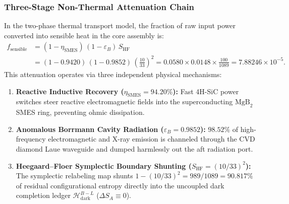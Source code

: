 \documentclass[11pt,onecolumn]{article}
\begin{document}
\subsubsection{Three-Stage Non-Thermal Attenuation Chain}
In the two-phase thermal transport model, the fraction of raw input power converted into sensible heat in the core assembly is:
\begin{equation}
\begin{split}
f_{\text{sensible}} &= (1 - \eta_{\text{SMES}})\,(1 - \varepsilon_B)\,S_{\text{HF}} \\
&= (1 - 0.9420)\,(1 - 0.9852)\,\left(\frac{10}{33}\right)^2 = 0.0580 \times 0.0148 \times \frac{100}{1089} = 7.88246\times 10^{-5}.
\end{split}
\label{eq:fsensible}
\end{equation}
This attenuation operates via three independent physical mechanisms:
\begin{enumerate}
    \item \textbf{Reactive Inductive Recovery ($\eta_{\text{SMES}} = 94.20\%$):} Fast 4H-SiC power switches steer reactive electromagnetic fields into the superconducting $\text{MgB}_2$ SMES ring, preventing ohmic dissipation.
    \item \textbf{Anomalous Borrmann Cavity Radiation ($\varepsilon_B = 0.9852$):} $98.52\%$ of high-frequency electromagnetic and X-ray emission is channeled through the CVD diamond Laue waveguide and dumped harmlessly out the aft radiation port.
    \item \textbf{Heegaard--Floer Symplectic Boundary Shunting ($S_{\text{HF}} = (10/33)^2$):} The symplectic relabeling map shunts $1 - (10/33)^2 = 989/1089 = 90.817\%$ of residual configurational entropy directly into the uncoupled dark completion ledger $\mathcal{H}_{\text{dark}}^{B-L}$ ($\Delta S_A \equiv 0$).
\end{enumerate}
\end{document}
